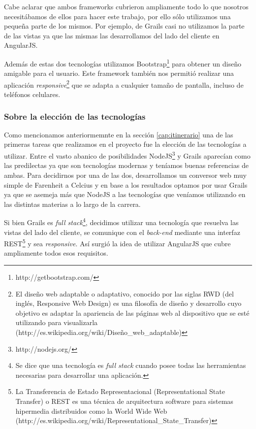 Cabe aclarar que ambos frameworks cubrieron ampliamente todo lo que nosotros necesitábamos de ellos para hacer este trabajo, por ello sólo utilizamos una pequeña parte de los mismos. Por ejemplo, de Grails casi no utilizamos la parte de las vistas ya que las mismas las desarrollamos del lado del cliente en AngularJS.

Además de estas dos tecnologías utilizamos Bootstrap\footnote{http://getbootstrap.com/} para obtener un diseño amigable para el usuario. Este framework también nos permitió realizar una aplicación \textit{responsive}\footnote{El diseño web adaptable o adaptativo, conocido por las siglas RWD (del inglés, Responsive Web Design) es una filosofía de diseño y desarrollo cuyo objetivo es adaptar la apariencia de las páginas web al dispositivo que se esté utilizando para visualizarla (http://es.wikipedia.org/wiki/Diseño\_web\_adaptable)} que se adapta a cualquier tamaño de pantalla, incluso de teléfonos celulares.

\subsubsection{Sobre la elección de las tecnologías}\label{cap:eleccion_tecnologias}
Como mencionamos anteriormemnte en la sección \ref{cap:itinerario} una de las primeras tareas que realizamos en el proyecto fue la elección de las tecnologías a utilizar. Entre el vasto abanico de posibilidades NodeJS\footnote{http://nodejs.org/} y Grails aparecían como las predilectas ya que son tecnologías modernas y teníamos buenas referencias de ambas. Para decidirnos por una de las dos, desarrollamos un conversor web muy simple de Farenheit a Celcius y en base a los resultados optamos por usar Grails ya que se asemeja más que NodeJS a las tecnologías que veníamos utilizando en las distintas materias a lo largo de la carrera.

Si bien Grails es \textit{full stack}\footnote{Se dice que una tecnología es \textit{full stack} cuando posee todas las herramientas necesarias para desarrollar una aplicación.}, decidimos utilizar una tecnología que resuelva las vistas del lado del cliente, se comunique con el \textit{back-end} mediante una interfaz REST\footnote{La Transferencia de Estado Representacional (Representational State Transfer) o REST es una técnica de arquitectura software para sistemas hipermedia distribuidos como la World Wide Web (http://es.wikipedia.org/wiki/Representational\_State\_Transfer)} 
y sea \textit{responsive}. Así surgió la idea de utilizar AngularJS que cubre ampliamente todos esos requisitos.

